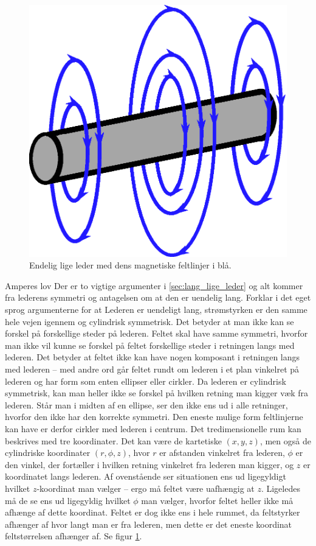 %
\begin{figure}
    \centering
    \includegraphics[width=.5\columnwidth]{facit/figurer/lige_leder.eps}
    \caption{Endelig lige leder med dens magnetiske feltlinjer i blå.}
    \label{fig:lige leder}
\end{figure}
%
\begin{opgave}{Amperes lov}
    Der er to vigtige argumenter i \ref{sec:lang_lige_leder} og alt kommer fra lederens symmetri og antagelsen om at den er uendelig lang. Forklar i det eget sprog argumenterne for at
    \opg Lederen er uendeligt lang, strømstyrken er den samme hele vejen igennem og cylindrisk symmetrisk. Det betyder at man ikke kan se forskel på forskellige steder på lederen. Feltet skal have samme symmetri, hvorfor man ikke vil kunne se forskel på feltet forskellige steder i retningen langs med lederen. Det betyder at feltet ikke kan have nogen komposant i retningen langs med lederen -- med andre ord går feltet rundt om lederen i et plan vinkelret på lederen og har form som enten ellipser eller cirkler. Da lederen er cylindrisk symmetrisk, kan man heller ikke se forskel på hvilken retning man kigger væk fra lederen. Står man i midten af en ellipse, ser den ikke ens ud i alle retninger, hvorfor den ikke har den korrekte symmetri. Den eneste mulige form feltlinjerne kan have er derfor cirkler med lederen i centrum.
    \opg Det tredimensionelle rum kan beskrives med tre koordinater. Det kan være de kartetiske $(x,y,z)$, men også de cylindriske koordinater $(r,\phi,z)$, hvor $r$ er afstanden vinkelret fra lederen, $\phi$ er den vinkel, der fortæller i hvilken retning vinkelret fra lederen man kigger, og $z$ er koordinatet langs lederen. Af ovenstående ser situationen ens ud ligegyldigt hvilket $z$-koordinat man vælger -- ergo må feltet være uafhængig at $z$. Ligeledes må de se ens ud ligegyldig hvilket $\phi$ man vælger, hvorfor feltet heller ikke må afhænge af dette koordinat. Feltet er dog ikke ens i hele rummet, da feltstyrker afhænger af hvor langt man er fra lederen, men dette er det eneste koordinat feltstørrelsen afhænger af.
    \opg Se figur \ref{fig:lige leder}.
\end{opgave}


